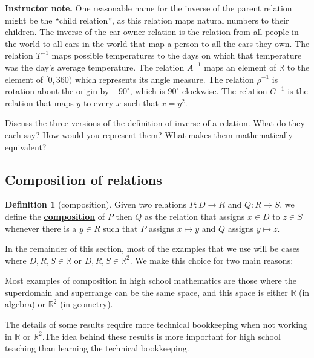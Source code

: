 \documentclass[11pt]{article}
\newcommand\smallnote[1]
	{\begin{mdframed}\raggedright  {\bf Instructor note.} {#1} \end{mdframed}}
\newenvironment{task}
	{\begin{mdframed}[linecolor=lightgray, linewidth=3pt]\raggedright}
	{\end{mdframed}}
\newcommand{\R}{\mathbb{R}}
\newcommand\degrees{^\circ}
\renewcommand\emph[1]{\underline{\bf{#1}}} %
\theoremstyle{definition}
\newtheorem{definition}[theorem]{Definition}
\begin{document}
\smallnote{One reasonable name for the inverse of the parent relation might be the ``child relation'', as this relation maps natural numbers to their children. The inverse of the car-owner relation is the relation from all people in the world to all cars in the world that map a person to all the cars they own. The relation $T^{-1}$ maps possible temperatures to the days on which that temperature was the day's average temperature. The relation $A^{-1}$ maps an element of $\R$ to the element of $[0,360)$ which represents its angle measure. The relation $\rho^{-1}$ is rotation about the origin by $-90\degrees$, which is $90\degrees$ clockwise. The relation $G^{-1}$ is the relation that maps $y$ to every $x$ such that $x=y^2$.}

\begin{task}
Discuss the three versions of the definition of inverse of a relation. What do they each say? How would you represent them? What makes them mathematically equivalent?
\end{task}

\subsection{Composition of relations}

\begin{definition}[composition]\label{d: relation composition}
Given two relations $P:D\to R$ and $Q:R\to S$, we define the \emph{composition} of $P$ then $Q$ 
as the relation that assigns $x\in D$ to $z\in S$ whenever there is a $y\in R$ such that $P$ assigns $x\mapsto y$ and $Q$ assigns $y\mapsto z$.
\end{definition}

In the remainder of this section, most of the examples that we use will be cases where $D, R, S\in \R$ or $D, R, S\in \R^2$. We make this choice for two main reasons:
	\begin{itemize*}
	\item Most examples of composition in high school mathematics are those where the superdomain and superrange can be the same space, and this space is either $\R$ (in algebra) or $\R^2$ (in geometry).
	\item The details of some results require more technical bookkeeping when not working in $\R$ or $\R^2$.The idea behind these results is more important for high school teaching than learning the technical bookkeeping.
	\end{itemize*}
	
\end{document}
